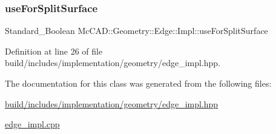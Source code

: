 \subsubsection{\texorpdfstring{use\+For\+Split\+Surface}{useForSplitSurface}}
{\footnotesize\ttfamily Standard\+\_\+\+Boolean Mc\+C\+A\+D\+::\+Geometry\+::\+Edge\+::\+Impl\+::use\+For\+Split\+Surface}



Definition at line 26 of file build/includes/implementation/geometry/edge\+\_\+impl.\+hpp.



The documentation for this class was generated from the following files\+:\begin{DoxyCompactItemize}
\item 
\hyperlink{build_2includes_2implementation_2geometry_2edge__impl_8hpp}{build/includes/implementation/geometry/edge\+\_\+impl.\+hpp}\item 
\hyperlink{edge__impl_8cpp}{edge\+\_\+impl.\+cpp}\end{DoxyCompactItemize}
